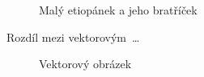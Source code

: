 \documentclass[a4paper, 11pt]{article}
\begin{document}
\begin{figure}[ht]
\begin{center}
{	 }
	\caption{Malý etiopánek a jeho bratříček}
	\label{Etiopan}
\end{center}
\end{figure}

\newpage
Rozdíl mezi vektorovým\, \ldots
\begin{figure}[ht]
\begin{center}
    \caption{Vektorový obrázek}
    \label{Vektor}
\end{center}
\end{figure}
\end{document}
